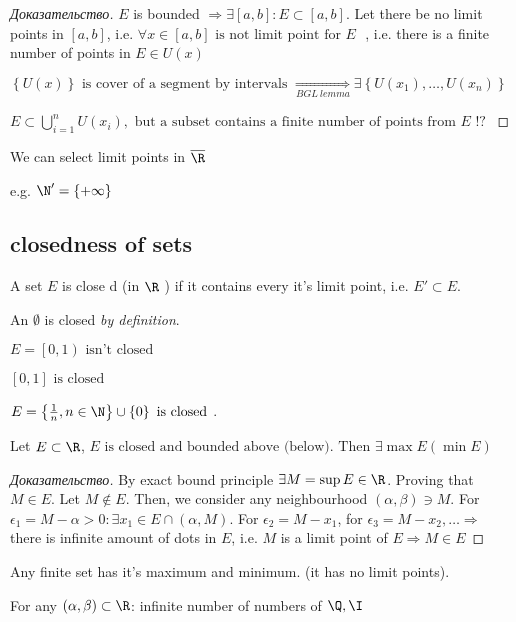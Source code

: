 \begin{proof}[Доказательство]
	$E$ is bounded $ \Rightarrow \exists \left[ a,b \right]: E \subset \left[ a,b \right]$. Let there be no limit points in $\left[ a,b \right]$, i.e. $\forall x \in \left[ a,b \right] \text{ is not limit point for $E$ }$, i.e. there is a finite number of points in $E \in U(x)$

	$\left\{ U(x) \right \} \text{ is cover of a segment by intervals } \underset{BGL \ lemma}{ \Rightarrow } \exists \left\{ U(x_1), \dots , U(x_n) \right \}   $

	$E \subset \bigcup_{i=1} ^ n U(x_i), \text{ but a subset contains a finite number of points from $E$ !? } $
\end{proof}


\begin{note}[]
	We can select limit points in $\overline{\R}$ 

	e.g. $\N' = \left\{ +\infty \right \} $
\end{note}

\subsection{closedness of sets}

\begin{definition}[]
	A set $E$ is close d (in $\R$ ) if it contains every it's limit point, i.e. $E' \subset E$.

	An $\emptyset$ is closed \textit{by definition}.
\end{definition}

\begin{example}[]
	$E = \left[ 0, 1 \right) \text{ isn't closed } $ 

	$\left[ 0,1 \right] \text{ is closed } $ 

	$E = \left\{ \frac{1}{n}, n \in \N \right \} \cup \left\{ 0 \right \} \text{ is closed } $.
\end{example}

\begin{lemma}
	Let $E \subset \R$, $E \text{ is closed and bounded above (below). Then }  \exists \max E (\min E)$
\end{lemma}

\begin{proof}[Доказательство]
	By exact bound principle $\exists M = \sup E \in \R$. Proving that $M \in E$. Let $M \notin E$. Then, we consider any neighbourhood $\left( \alpha, \beta \right) \ni M$. For $\epsilon_1 = M - \alpha > 0: \exists x_1 \in E \cap \left( \alpha, M \right)  $. For $\epsilon_2 = M - x_1$, for $\epsilon_3 = M - x_2, \dots  \Rightarrow $ there is infinite amount of dots in $E$, i.e. $M$ is a limit point of $E \Rightarrow M \in E$ 
\end{proof}

\begin{corollary}[]
	Any finite set has it's maximum and minimum. (it has no limit points).
\end{corollary}

\begin{corollary}[]
	For any $\left( \alpha, \beta \right) \subset \R$: infinite number of numbers of $\Q, \I$
\end{corollary}
